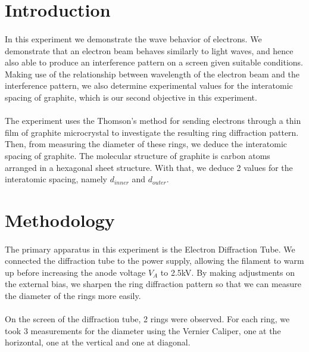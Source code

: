 \documentclass[11pt]{article}
\begin{document}
\maketitle

\section{Introduction}
\paragraph{}
In this experiment we demonstrate the wave behavior of electrons. We demonstrate that an electron beam behaves similarly to light waves, and hence also able to produce an interference pattern on a screen given suitable conditions. Making use of the relationship between wavelength of the electron beam and the interference pattern, we also determine experimental values for the interatomic spacing of graphite, which is our second objective in this experiment.

\paragraph{}
The experiment uses the Thomson's method for sending electrons through a thin film of graphite microcrystal to investigate the resulting ring diffraction pattern. Then, from measuring the diameter of these rings, we deduce the interatomic spacing of graphite. The molecular structure of graphite is carbon atoms arranged in a hexagonal sheet structure. With that, we deduce 2 values for the interatomic spacing, namely $d_{inner}$ and $d_{outer}$.

\section{Methodology}
\paragraph{}
The primary apparatus in this experiment is the Electron Diffraction Tube. We connected the diffraction tube to the power supply, allowing the filament to warm up before increasing the anode voltage $V_A$ to 2.5kV. By making adjustments on the external bias, we sharpen the ring diffraction pattern so that we can measure the diameter of the rings more easily.

\paragraph{}
On the screen of the diffraction tube, 2 rings were observed. For each ring, we took 3 measurements for the diameter using the Vernier Caliper, one at the horizontal, one at the vertical and one at diagonal.
\end{document}
